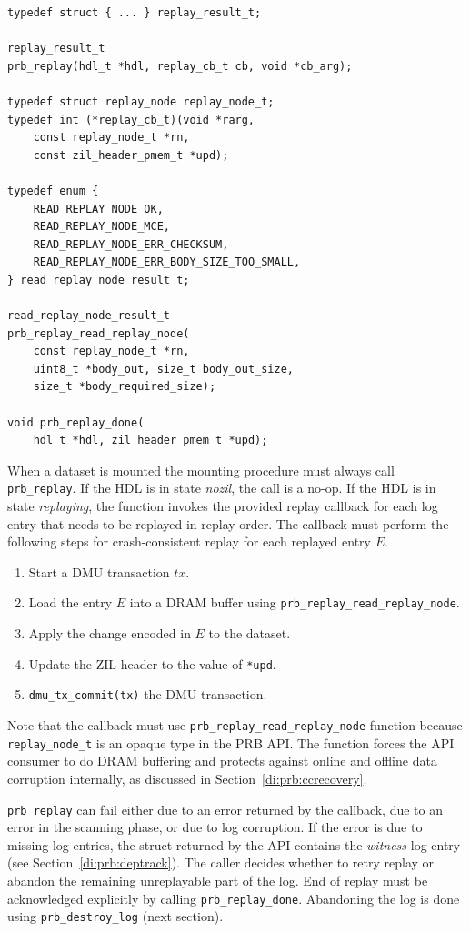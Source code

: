 \documentclass[12pt,a4paper,twoside]{book}
\begin{document}
\begin{lstlisting}
typedef struct { ... } replay_result_t;

replay_result_t
prb_replay(hdl_t *hdl, replay_cb_t cb, void *cb_arg);

typedef struct replay_node replay_node_t;
typedef int (*replay_cb_t)(void *rarg,
    const replay_node_t *rn,
    const zil_header_pmem_t *upd);

typedef enum {
	READ_REPLAY_NODE_OK,
	READ_REPLAY_NODE_MCE,
	READ_REPLAY_NODE_ERR_CHECKSUM,
	READ_REPLAY_NODE_ERR_BODY_SIZE_TOO_SMALL,
} read_replay_node_result_t;

read_replay_node_result_t
prb_replay_read_replay_node(
    const replay_node_t *rn,
    uint8_t *body_out, size_t body_out_size,
    size_t *body_required_size);

void prb_replay_done(
    hdl_t *hdl, zil_header_pmem_t *upd);

\end{lstlisting}

When a dataset is mounted the mounting procedure must always call \lstinline{prb_replay}.
If the HDL is in state \textit{nozil}, the call is a no-op.
If the HDL is in state \textit{replaying}, the function invokes the provided replay callback for each log entry that needs to be replayed in replay order.
The callback must perform the following steps for crash-consistent replay for each replayed entry $E$.
\begin{enumerate}[noitemsep]
    \item Start a DMU transaction $tx$.
    \item Load the entry $E$ into a DRAM buffer using \lstinline{prb_replay_read_replay_node}.
    \item Apply the change encoded in $E$ to the dataset.
    \item Update the ZIL header to the value of \lstinline{*upd}.
    \item \lstinline{dmu_tx_commit(tx)} the DMU transaction.
\end{enumerate}

Note that the callback must use \lstinline{prb_replay_read_replay_node} function because \lstinline{replay_node_t} is an opaque type in the PRB API.
The function forces the API consumer to do DRAM buffering and protects against online and offline data corruption internally, as discussed in Section~\ref{di:prb:ccrecovery}.

\lstinline{prb_replay} can fail either due to an error returned by the callback, due to an error in the scanning phase, or due to log corruption.
If the error is due to missing log entries, the struct returned by the API contains the \textit{witness} log entry (see Section~\ref{di:prb:deptrack}).
The caller decides whether to retry replay or abandon the remaining unreplayable part of the log.
End of replay must be acknowledged explicitly by calling \lstinline{prb_replay_done}.
Abandoning the log is done using \lstinline{prb_destroy_log} (next section).
\end{document}
